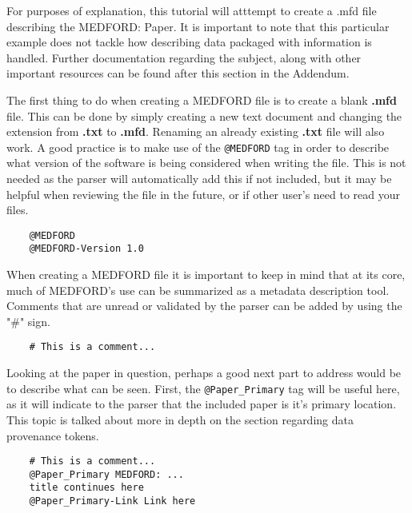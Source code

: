 \documentclass[]{article}%
\begin{document}

For purposes of explanation, this tutorial will atttempt to create a .mfd file describing the MEDFORD: Paper. It is important to note that this particular example does not tackle how describing data packaged with information is handled. Further documentation regarding the subject, along with other important resources can be found after this section in the Addendum.


The first thing to do when creating a MEDFORD file is to create a blank \textbf{.mfd} file. This can be done by simply creating a new text document and changing the extension from \textbf{.txt} to \textbf{.mfd}. Renaming an already existing \textbf{.txt} file will also work. A good practice is to make use of the \texttt{@MEDFORD} tag in order to describe what version of the software is being considered when writing the file. This is not needed as the parser will automatically add this if not included, but it may be helpful when reviewing the file in the future, or if other user's need to read your files.
\begin{small}
\begin{verbatim}
    @MEDFORD
    @MEDFORD-Version 1.0
\end{verbatim}
\end{small}
When creating a MEDFORD file it is important to keep in mind that at its core, much of MEDFORD's use can be summarized as a metadata description tool. Comments that are unread or validated by the parser can be added by using the "\#" sign.

\begin{small}
\begin{verbatim}
    # This is a comment...
\end{verbatim}
\end{small}

Looking at the paper in question, perhaps a good next part to address would be to describe what can be seen. First, the \texttt{@Paper\_Primary} tag will be useful here, as it will indicate to the parser that the included paper is it's primary location. This topic is talked about more in depth on the section regarding data provenance tokens. 

\begin{small}
\begin{verbatim}
    # This is a comment...
    @Paper_Primary MEDFORD: ...
    title continues here
    @Paper_Primary-Link Link here
\end{verbatim}
\end{small}
\end{document}
